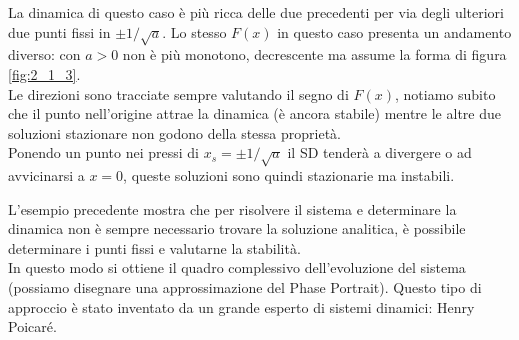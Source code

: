 \begin{exmp}
\begin{description}
{	        \label{fig:2_1_3}
	    }
	    La dinamica di questo caso è più ricca delle due precedenti per via degli ulteriori due punti fissi in $\pm 1 /\sqrt{a}$. Lo stesso $F(x)$ in questo caso presenta un andamento diverso: con $a>0$ non è più monotono, decrescente ma assume la forma di figura \ref{fig:2_1_3}.\\
	    Le direzioni sono tracciate sempre valutando il segno di $F(x)$, notiamo subito che il punto nell'origine attrae la dinamica (è ancora stabile) mentre le altre due soluzioni stazionare non godono della stessa proprietà.\\
	    Ponendo un punto nei pressi di $x_s = \pm 1 /\sqrt{a} $ il SD tenderà a divergere o ad avvicinarsi a $x=0$, queste soluzioni sono quindi stazionarie ma instabili.
    \end{description}
\end{exmp}
\noindent
L'esempio precedente mostra che per risolvere il sistema e determinare la dinamica non è sempre necessario trovare la soluzione analitica, è possibile determinare i punti fissi e valutarne la stabilità.\\
In questo modo si ottiene il quadro complessivo dell'evoluzione del sistema (possiamo disegnare una approssimazione del Phase Portrait). Questo tipo di approccio è stato inventato da un grande esperto di sistemi dinamici: Henry Poicaré.
